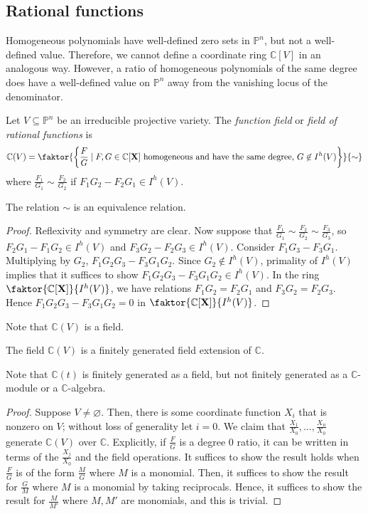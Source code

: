 \subsection{Rational functions}
Homogeneous polynomials have well-defined zero sets in \( \mathbb P^n \), but not a well-defined value.
Therefore, we cannot define a coordinate ring \( \mathbb C[V] \) in an analogous way.
However, a ratio of homogeneous polynomials of the same degree does have a well-defined value on \( \mathbb P^n \) away from the vanishing locus of the denominator.
\begin{definition}
    Let \( V \subseteq \mathbb P^n \) be an irreducible projective variety.
    The \emph{function field} or \emph{field of rational functions} is
    \[ \mathbb C(V) = \faktor{\qty{\frac{F}{G} \mid F, G \in \mathbb C[\vb X] \text{ homogeneous and have the same degree, } G \not\in I^h(V)}}{\sim} \]
    where \( \frac{F_1}{G_1} \sim \frac{F_2}{G_2} \) if \( F_1 G_2 - F_2 G_1 \in I^h(V) \).
\end{definition}
\begin{lemma}
    The relation \( \sim \) is an equivalence relation.
\end{lemma}
\begin{proof}
    Reflexivity and symmetry are clear.
    Now suppose that \( \frac{F_1}{G_1} \sim \frac{F_2}{G_2} \sim \frac{F_3}{G_3} \), so \( F_2 G_1 - F_1 G_2 \in I^h(V) \) and \( F_3 G_2 - F_2 G_3 \in I^h(V) \).
    Consider \( F_1 G_3 - F_3 G_1 \).
    Multiplying by \( G_2 \), \( F_1 G_2 G_3 - F_3 G_1 G_2 \).
    Since \( G_2 \not\in I^h(V) \), primality of \( I^h(V) \) implies that it suffices to show \( F_1 G_2 G_3 - F_3 G_1 G_2 \in I^h(V) \).
    In the ring \( \faktor{\mathbb C[\vb X]}{I^h(V)} \), we have relations \( F_1 G_2 = F_2 G_1 \) and \( F_3 G_2 = F_2 G_3 \).
    Hence \( F_1 G_2 G_3 - F_3 G_1 G_2 = 0 \) in \( \faktor{\mathbb C[\vb X]}{I^h(V)} \).
\end{proof}
Note that \( \mathbb C(V) \) is a field.
\begin{proposition}
    The field \( \mathbb C(V) \) is a finitely generated field extension of \( \mathbb C \).
\end{proposition}
Note that \( \mathbb C(t) \) is finitely generated as a field, but not finitely generated as a \( \mathbb C \)-module or a \( \mathbb C \)-algebra.
\begin{proof}
    Suppose \( V \neq \varnothing \).
    Then, there is some coordinate function \( X_i \) that is nonzero on \( V \); without loss of generality let \( i = 0 \).
    We claim that \( \frac{X_1}{X_0}, \dots, \frac{X_n}{X_0} \) generate \( \mathbb C(V) \) over \( \mathbb C \).
    Explicitly, if \( \frac{F}{G} \) is a degree 0 ratio, it can be written in terms of the \( \frac{X_j}{X_0} \) and the field operations.
    It suffices to show the result holds when \( \frac{F}{G} \) is of the form \( \frac{M}{G} \) where \( M \) is a monomial.
    Then, it suffices to show the result for \( \frac{G}{M} \) where \( M \) is a monomial by taking reciprocals.
    Hence, it suffices to show the result for \( \frac{M}{M'} \) where \( M, M' \) are monomials, and this is trivial.
\end{proof}
